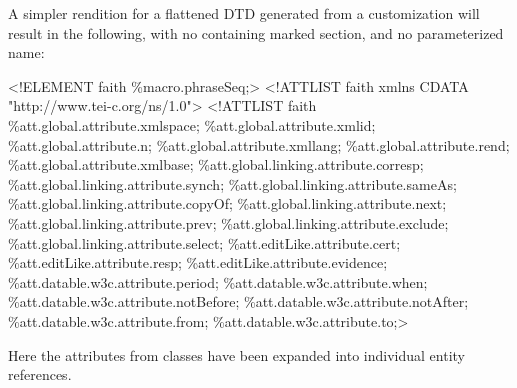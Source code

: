 A simpler rendition for a flattened DTD generated from a customization will result in the following, with no containing marked section, and no parameterized name: \par\hfill\bgroup\exampleFont\vskip 10pt\begin{shaded}
\obeyspaces <!ELEMENT faith \%macro.phraseSeq;>\newline
<!ATTLIST faith xmlns CDATA "http://www.tei-c.org/ns/1.0">\newline
<!ATTLIST faith\newline
 \%att.global.attribute.xmlspace;\newline
 \%att.global.attribute.xmlid;\newline
 \%att.global.attribute.n;\newline
 \%att.global.attribute.xmllang;\newline
 \%att.global.attribute.rend;\newline
 \%att.global.attribute.xmlbase;\newline
 \%att.global.linking.attribute.corresp;\newline
 \%att.global.linking.attribute.synch;\newline
 \%att.global.linking.attribute.sameAs;\newline
 \%att.global.linking.attribute.copyOf;\newline
 \%att.global.linking.attribute.next;\newline
 \%att.global.linking.attribute.prev;\newline
 \%att.global.linking.attribute.exclude;\newline
 \%att.global.linking.attribute.select;\newline
 \%att.editLike.attribute.cert;\newline
 \%att.editLike.attribute.resp;\newline
 \%att.editLike.attribute.evidence;\newline
 \%att.datable.w3c.attribute.period;\newline
 \%att.datable.w3c.attribute.when;\newline
 \%att.datable.w3c.attribute.notBefore;\newline
 \%att.datable.w3c.attribute.notAfter;\newline
 \%att.datable.w3c.attribute.from;\newline
 \%att.datable.w3c.attribute.to;>\end{shaded}
\par\egroup 
 Here the attributes from classes have been expanded into individual entity references.
